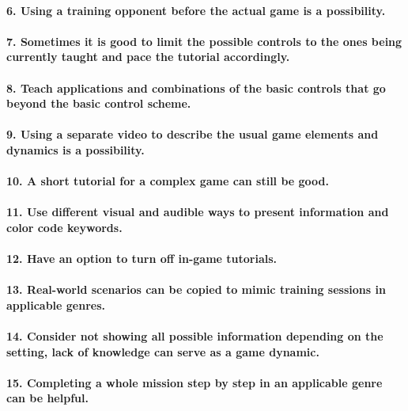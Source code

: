 \paragraph{6. Using a training opponent before the actual game is a possibility.}
\paragraph{7. Sometimes it is good to limit the possible controls to the ones being currently taught and pace the tutorial accordingly.}
\paragraph{8. Teach applications and combinations of the basic controls that go beyond the basic control scheme.}
\paragraph{9. Using a separate video to describe the usual game elements and dynamics is a possibility.}
\paragraph{10. A short tutorial for a complex game can still be good.}
\paragraph{11. Use different visual and audible ways to present information and color code keywords.}
\paragraph{12. Have an option to turn off in-game tutorials.}
\paragraph{13. Real-world scenarios can be copied to mimic training sessions in applicable genres.}
\paragraph{14. Consider not showing all possible information depending on the setting, lack of knowledge can serve as a game dynamic.}
\paragraph{15. Completing a whole mission step by step in an applicable genre can be helpful.}
